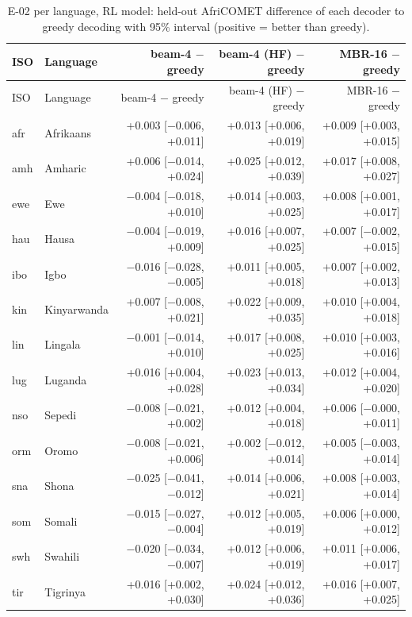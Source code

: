 {\scriptsize\setlength{\tabcolsep}{1.5pt}
\begin{longtable}{@{}llrrr@{}}
\caption{E-02 per language, RL model: held-out AfriCOMET difference of each decoder to greedy decoding with 95\% interval (positive = better than greedy).}\label{tab:dec-d-rl-c}\\
\toprule
ISO & Language & beam-4 $-$ greedy & beam-4 (HF) $-$ greedy & MBR-16 $-$ greedy \\
\midrule\endfirsthead
\toprule
ISO & Language & beam-4 $-$ greedy & beam-4 (HF) $-$ greedy & MBR-16 $-$ greedy \\
\midrule\endhead
\midrule\endfoot
\bottomrule\endlastfoot
afr & Afrikaans & +0.003 [$-$0.006, +0.011] & +0.013 [+0.006, +0.019] & +0.009 [+0.003, +0.015] \\
amh & Amharic & +0.006 [$-$0.014, +0.024] & +0.025 [+0.012, +0.039] & +0.017 [+0.008, +0.027] \\
ewe & Ewe & $-$0.004 [$-$0.018, +0.010] & +0.014 [+0.003, +0.025] & +0.008 [+0.001, +0.017] \\
hau & Hausa & $-$0.004 [$-$0.019, +0.009] & +0.016 [+0.007, +0.025] & +0.007 [$-$0.002, +0.015] \\
ibo & Igbo & $-$0.016 [$-$0.028, $-$0.005] & +0.011 [+0.005, +0.018] & +0.007 [+0.002, +0.013] \\
kin & Kinyarwanda & +0.007 [$-$0.008, +0.021] & +0.022 [+0.009, +0.035] & +0.010 [+0.004, +0.018] \\
lin & Lingala & $-$0.001 [$-$0.014, +0.010] & +0.017 [+0.008, +0.025] & +0.010 [+0.003, +0.016] \\
lug & Luganda & +0.016 [+0.004, +0.028] & +0.023 [+0.013, +0.034] & +0.012 [+0.004, +0.020] \\
nso & Sepedi & $-$0.008 [$-$0.021, +0.002] & +0.012 [+0.004, +0.018] & +0.006 [$-$0.000, +0.011] \\
orm & Oromo & $-$0.008 [$-$0.021, +0.006] & +0.002 [$-$0.012, +0.014] & +0.005 [$-$0.003, +0.014] \\
sna & Shona & $-$0.025 [$-$0.041, $-$0.012] & +0.014 [+0.006, +0.021] & +0.008 [+0.003, +0.014] \\
som & Somali & $-$0.015 [$-$0.027, $-$0.004] & +0.012 [+0.005, +0.019] & +0.006 [+0.000, +0.012] \\
swh & Swahili & $-$0.020 [$-$0.034, $-$0.007] & +0.012 [+0.006, +0.019] & +0.011 [+0.006, +0.017] \\
tir & Tigrinya & +0.016 [+0.002, +0.030] & +0.024 [+0.012, +0.036] & +0.016 [+0.007, +0.025] \\

\end{longtable}}
